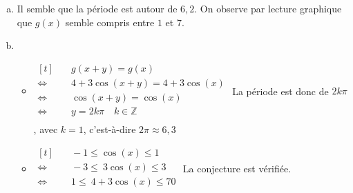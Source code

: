 \documentclass[12pt, a4paper]{article}
\begin{document}
\begin{Exercise}[number={88}]
    \begin{enumerate}[a)]
        \item Il semble que la période est autour de $6{,}2$. On observe par lecture graphique que $g(x)$ semble compris entre $1$ et $7$.
        \item   \begin{itemize}
                    \item   $\begin{aligned}[t]
                                &\quad g(x+y)=g(x) \\
                                \iff&\quad 4+3\cos(x+y)=4+3\cos(x) \\
                                \iff&\quad \cos(x+y)=\cos(x) \\
                                \iff&\quad y=2k\pi\quad k\in\mathbb{Z} \\
                            \end{aligned}$ \smallbreak
                            La période est donc de $2k\pi$, avec $k=1$, c'est-à-dire $2\pi\approx 6{,}3$ \medbreak
                    \item   $\begin{aligned}[t]
                                &\quad -1\leq\cos(x)\leq 1 \\
                                \iff&\quad -3\leq\ 3\cos(x)\leq 3 \\
                                \iff&\quad 1\leq\ 4+3\cos(x)\leq 70 \\
                            \end{aligned}$ \smallbreak
                            La conjecture est vérifiée. \medbreak
                \end{itemize}
    \end{enumerate}
\end{Exercise}
\end{document}

